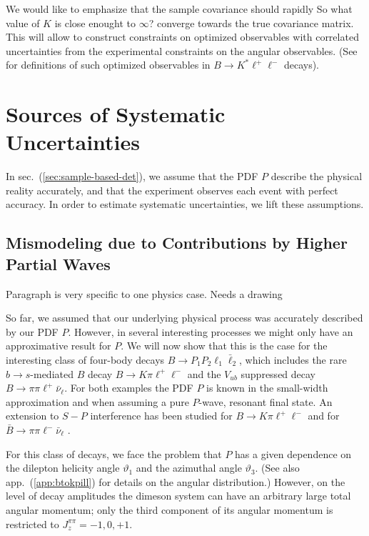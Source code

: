 \documentclass[aps,prd,reprint,nofootinbib,preprintnumbers]{revtex4}
\newcommand{\refapp}[1]{app.~(\ref{app:#1})}
\newcommand{\refsec}[1]{sec.~(\ref{sec:#1})}
\renewcommand{\theta}{\vartheta}
\newcommand{\fred}[1]{{\color{brown!85!black}#1}}
\begin{document}
We would like to emphasize that the sample covariance should rapidly \fred{So what value of $K$ is close enought to $\infty$?} converge towards the true covariance matrix.
This will allow to construct constraints on optimized observables with correlated uncertainties
from the experimental constraints on the angular observables. (See \cite{Egede:2008uy,Egede:2010zc,Bobeth:2010wg,Becirevic:2011bp,Bobeth:2012vn,Matias:2012xw,DescotesGenon:2012zf}
for definitions of such optimized observables in $B\to K^*\ell^+\ell^-$ decays).



\section{Sources of Systematic Uncertainties}
\label{sec:systematics}

In \refsec{sample-based-det}, we assume that the PDF $P$ describe the physical reality accurately,
and that the experiment observes each event with perfect accuracy. In order to estimate systematic
uncertainties, we lift these assumptions.

\subsection{Mismodeling due to Contributions by Higher Partial Waves}
\label{sec:systematics:partial-waves}

\fred{Paragraph is very specific to one physics case. Needs a drawing}

So far, we assumed that our underlying physical process was accurately described by our PDF $P$.
However, in several interesting processes we might only have an approximative result for $P$.
We will now show that this is the case for the interesting class of four-body decays $B\to P_1 P_2 \ell_1 \bar\ell_2$,
which includes the rare $b\to s$-mediated $B$ decay $B \to K\pi\ell^+\ell^-$ and the $V_{ub}$ suppressed decay
$B\to \pi\pi\ell^+\bar\nu_\ell$. For both examples the PDF $P$ is known in the small-width approximation
and when assuming a pure $P$-wave, resonant final state. An extension to $S-P$ interference has been
studied for $B\to K\pi\ell^+\ell^-$ \cite{Blake:2012mb,Becirevic:2011bp} and for $\bar{B}\to \pi\pi\ell^-\bar\nu_\ell$
\cite{Faller:2013dwa}.

For this class of decays, we face the problem that $P$ has a given dependence on the dilepton helicity angle $\theta_1$
and the azimuthal angle $\theta_3$. (See also \refapp{btokpill} for details on the angular distribution.)
However, on the level of decay amplitudes the dimeson system can have an arbitrary
large total angular momentum; only the third component of its angular momentum is restricted to $J^{\pi\pi}_z = -1,0,+1$.\\
\end{document}

